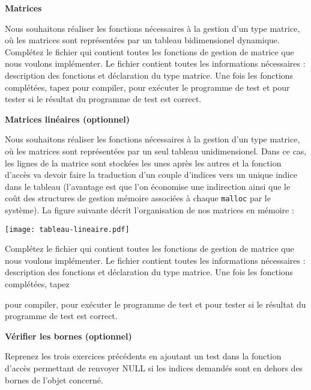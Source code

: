 \documentclass[10pt]{article}\usepackage[enonce]{exemptty}
\begin{document}
\medskip

\clearpage


\begin{Exercice} \textbf{Matrices}

  Nous souhaitons réaliser les fonctions nécessaires à la gestion d'un type
  matrice, où les matrices sont représentées par un tableau bidimensionel
  dynamique. Complétez le fichier  qui contient toutes les
  fonctions de gestion de matrice que nous voulons implémenter. Le fichier
   contient toutes les informations nécessaires : description
  des fonctions et déclaration du type matrice. Une fois les fonctions
  complétées, tapez  pour compiler,
   pour exécuter le programme de test et  pour tester si le résultat du programme de test est correct.
\end{Exercice}

\begin{Exercice} \textbf{Matrices linéaires (optionnel)} 

  Nous souhaitons réaliser les fonctions nécessaires à la gestion d'un type
  matrice, où les matrices sont représentées par un seul tableau
  unidimensionel. Dans ce cas, les lignes de la matrice sont stockées les unes
  après les autres et la fonction d'accès va devoir faire la traduction d'un
  couple d'indices vers un unique indice dans le tableau (l'avantage est que
  l'on économise une indirection ainsi que le coût des structures de gestion
  mémoire associées à chaque \texttt{malloc} par le système). La figure
  suivante décrit l'organisation de nos matrices en mémoire :

  \centerline{\texttt{[image: tableau-lineaire.pdf]}}

  Complétez le fichier  qui contient toutes les
  fonctions de gestion de matrice que nous voulons implémenter. Le fichier
   contient toutes les informations nécessaires :
  description des fonctions et déclaration du type matrice. Une fois les
  fonctions complétées, tapez
  
  \noindent{} pour
  compiler,  pour exécuter le programme de
  test et  pour tester si le résultat du programme de test est
  correct.
\end{Exercice}

\begin{Exercice} \textbf{Vérifier les bornes (optionnel)}

  Reprenez les trois exercices précédents en ajoutant un test dans la fonction
  d'accès permettant de renvoyer NULL si les indices demandés sont en dehors
  des bornes de l'objet concerné.
\end{Exercice}
\end{document}

